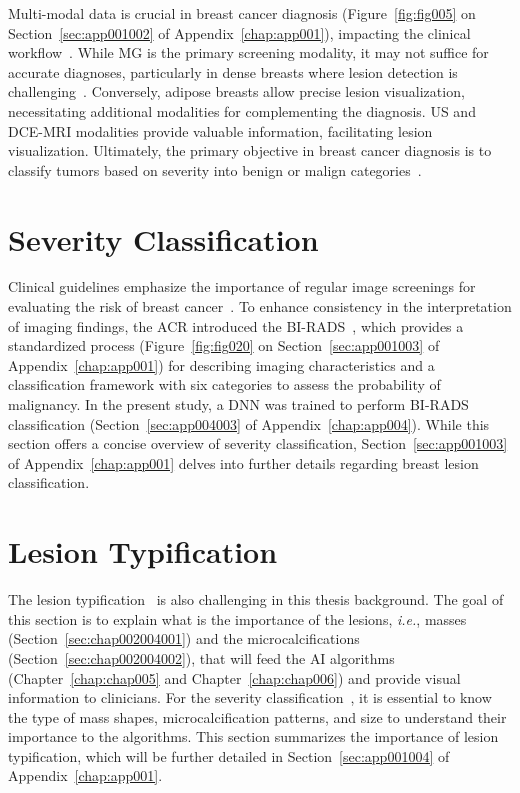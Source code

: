 Multi-modal data is crucial in breast cancer diagnosis (Figure~\ref{fig:fig005} on Section~\ref{sec:app001002} of Appendix~\ref{chap:app001}), impacting the clinical workflow~\cite{10.1117/1.JBO.22.4.046008}.
While \ac{MG} is the primary screening modality, it may not suffice for accurate diagnoses, particularly in dense breasts where lesion detection is challenging~\cite{10.1093/jbi/wbaa010}.
Conversely, adipose breasts allow precise lesion visualization, necessitating additional modalities for complementing the diagnosis.
\ac{US} and \acs{DCE-MRI} modalities provide valuable information, facilitating lesion visualization.
Ultimately, the primary objective in breast cancer diagnosis is to classify tumors based on severity into benign or malign categories~\cite{SHAN2016980}.

\section{Severity Classification}
\label{sec:chap002003}

Clinical guidelines emphasize the importance of regular image screenings for evaluating the risk of breast cancer~\cite{MIAO201817}.
To enhance consistency in the interpretation of imaging findings, the \acs{ACR} introduced the \acs{BI-RADS}~\cite{d2018breast}, which provides a standardized process (Figure~\ref{fig:fig020} on Section~\ref{sec:app001003} of Appendix~\ref{chap:app001}) for describing imaging characteristics and a classification framework with six categories to assess the probability of malignancy.
In the present study, a \acs{DNN} was trained to perform \acs{BI-RADS} classification (Section~\ref{sec:app004003} of Appendix~\ref{chap:app004}).
While this section offers a concise overview of severity classification, Section~\ref{sec:app001003} of Appendix~\ref{chap:app001} delves into further details regarding breast lesion classification.

\section{Lesion Typification}
\label{sec:chap002004}

The lesion typification~\cite{doi:10.1148/radiol.2018181371} is also challenging in this thesis background.
The goal of this section is to explain what is the importance of the lesions, {\it i.e.}, masses (Section~\ref{sec:chap002004001}) and the microcalcifications (Section~\ref{sec:chap002004002}), that will feed the \ac{AI} algorithms (Chapter~\ref{chap:chap005} and Chapter~\ref{chap:chap006}) and provide visual information to clinicians.
For the severity classification~\cite{8611096, 9231684}, it is essential to know the type of mass shapes, microcalcification patterns, and size to understand their importance to the algorithms.
This section summarizes the importance of lesion typification, which will be further detailed in Section~\ref{sec:app001004} of Appendix~\ref{chap:app001}.

